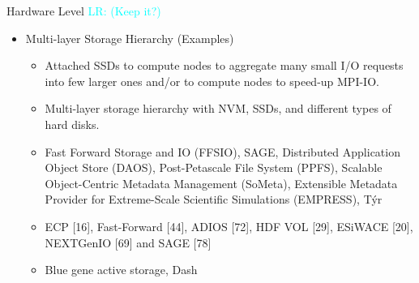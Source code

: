 \documentclass[compress,11pt,xcolor=svgnames,aspectratio=169]{beamer}
\newcommand{\lr}[1]{\textcolor{cyan}{LR: #1}}
\begin{document}
\begin{frame}[t]{Hardware Level \lr{(Keep it?)}}

\begin{itemize}

      \item Multi-layer Storage Hierarchy (Examples)\\[0.4cm]

        \begin{itemize}
        \setlength\itemsep{0.6cm}

        \item Attached SSDs to compute nodes to aggregate many small I/O requests into few larger ones and/or to compute nodes to speed-up MPI-IO.

        \item Multi-layer storage hierarchy with NVM, SSDs, and different types of hard disks. %

        \item Fast Forward Storage and IO (FFSIO), SAGE, Distributed Application Object Store (DAOS), Post-Petascale File System (PPFS), Scalable Object-Centric Metadata Management (SoMeta), Extensible Metadata Provider for Extreme-Scale Scientific Simulations (EMPRESS), Týr

        \item ECP [16], Fast-Forward [44], ADIOS [72], HDF VOL [29], ESiWACE [20], NEXTGenIO [69] and SAGE [78]

        \item Blue gene active storage, Dash

        \end{itemize}

\end{itemize}

\nocite{3372390}

\end{frame}
\end{document}
